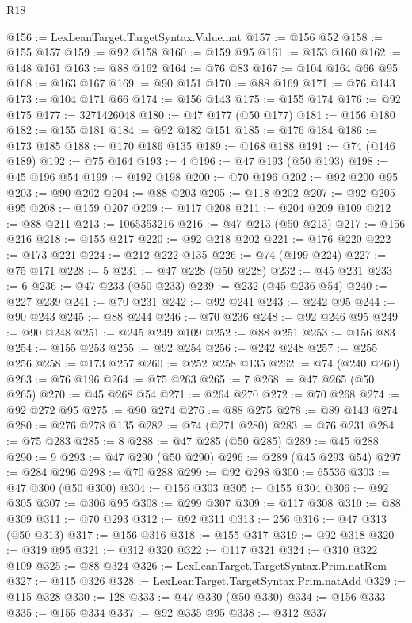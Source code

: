 \begin{lexlean}{R18}
\begin{coremodule}
@156 := LexLeanTarget.TargetSyntax.Value.nat
@157 := @156 @52
@158 := @155 @157
@159 := @92 @158
@160 := @159 @95
@161 := @153 @160
@162 := @148 @161
@163 := @88 @162
@164 := @76 @83
@167 := @104 @164 @66 @95
@168 := @163 @167
@169 := @90 @151
@170 := @88 @169
@171 := @76 @143
@173 := @104 @171 @66
@174 := @156 @143
@175 := @155 @174
@176 := @92 @175
@177 := 3271426048
@180 := @47 @177 (@50 @177)
@181 := @156 @180
@182 := @155 @181
@184 := @92 @182 @151
@185 := @176 @184
@186 := @173 @185
@188 := @170 @186 @135
@189 := @168 @188
@191 := @74 (@146 @189)
@192 := @75 @164
@193 := 4
@196 := @47 @193 (@50 @193)
@198 := @45 @196 @54
@199 := @192 @198
@200 := @70 @196
@202 := @92 @200 @95
@203 := @90 @202
@204 := @88 @203
@205 := @118 @202
@207 := @92 @205 @95
@208 := @159 @207
@209 := @117 @208
@211 := @204 @209 @109
@212 := @88 @211
@213 := 1065353216
@216 := @47 @213 (@50 @213)
@217 := @156 @216
@218 := @155 @217
@220 := @92 @218 @202
@221 := @176 @220
@222 := @173 @221
@224 := @212 @222 @135
@226 := @74 (@199 @224)
@227 := @75 @171
@228 := 5
@231 := @47 @228 (@50 @228)
@232 := @45 @231
@233 := 6
@236 := @47 @233 (@50 @233)
@239 := @232 (@45 @236 @54)
@240 := @227 @239
@241 := @70 @231
@242 := @92 @241
@243 := @242 @95
@244 := @90 @243
@245 := @88 @244
@246 := @70 @236
@248 := @92 @246 @95
@249 := @90 @248
@251 := @245 @249 @109
@252 := @88 @251
@253 := @156 @83
@254 := @155 @253
@255 := @92 @254
@256 := @242 @248
@257 := @255 @256
@258 := @173 @257
@260 := @252 @258 @135
@262 := @74 (@240 @260)
@263 := @76 @196
@264 := @75 @263
@265 := 7
@268 := @47 @265 (@50 @265)
@270 := @45 @268 @54
@271 := @264 @270
@272 := @70 @268
@274 := @92 @272 @95
@275 := @90 @274
@276 := @88 @275
@278 := @89 @143 @274
@280 := @276 @278 @135
@282 := @74 (@271 @280)
@283 := @76 @231
@284 := @75 @283
@285 := 8
@288 := @47 @285 (@50 @285)
@289 := @45 @288
@290 := 9
@293 := @47 @290 (@50 @290)
@296 := @289 (@45 @293 @54)
@297 := @284 @296
@298 := @70 @288
@299 := @92 @298
@300 := 65536
@303 := @47 @300 (@50 @300)
@304 := @156 @303
@305 := @155 @304
@306 := @92 @305
@307 := @306 @95
@308 := @299 @307
@309 := @117 @308
@310 := @88 @309
@311 := @70 @293
@312 := @92 @311
@313 := 256
@316 := @47 @313 (@50 @313)
@317 := @156 @316
@318 := @155 @317
@319 := @92 @318
@320 := @319 @95
@321 := @312 @320
@322 := @117 @321
@324 := @310 @322 @109
@325 := @88 @324
@326 := LexLeanTarget.TargetSyntax.Prim.natRem
@327 := @115 @326
@328 := LexLeanTarget.TargetSyntax.Prim.natAdd
@329 := @115 @328
@330 := 128
@333 := @47 @330 (@50 @330)
@334 := @156 @333
@335 := @155 @334
@337 := @92 @335 @95
@338 := @312 @337

\end{coremodule}
\end{lexlean}
